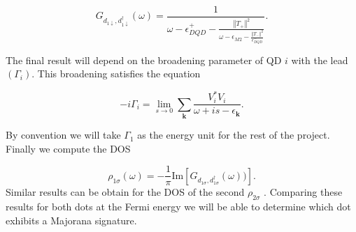 \documentclass[showpacs,aps,prb,reprint,superscriptaddress]{revtex4-1}
\begin{document}
\begin{equation}
    G_{{d_{1\downarrow},d_{1\downarrow}^{\dagger}}}\left(\omega\right)=\frac{1}{\omega-\epsilon_{DQD}^{+}-\frac{\left\Vert T_{+}\right\Vert ^{2}}{\omega-\epsilon_{M2}-\frac{\left\Vert T_{-}\right\Vert ^{2}}{\epsilon_{DQD}^{-}}}}.
    \label{eq:Green_NonInteracting}
\end{equation}


The final result will depend on the broadening parameter of QD $i$ with the lead $(\Gamma_i)$. This broadening satisfies the equation

\begin{equation}
   -i\Gamma_i = \lim_{s\rightarrow 0} \sum_{\boldsymbol{k}}\frac{V_{i}^{*}V_{i}}{\omega+ is -\epsilon_{\boldsymbol{k}}}.
\end{equation}

By convention we will take $\Gamma_1$ as the energy unit for the rest of the project. Finally we compute the DOS 


\begin{equation}
    \rho_{1\sigma}(\omega)=-\frac{1}{\pi} \textrm{Im} \left[G_{d_{1\sigma},d_{1\sigma}^\dagger}(\omega))\right].
    \label{eq:Density of States}
\end{equation}
Similar results can be obtain for the DOS of the second $\rho_{2\sigma}$ . Comparing these results for both dots at the Fermi energy we will be able to determine which dot exhibits a Majorana signature.


\end{document}
